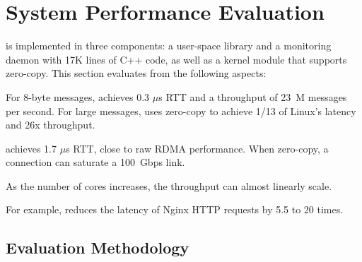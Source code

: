 \section{System Performance Evaluation}
\label{socksdirect:sec:evaluation}


\sys{} is implemented in three components: a user-space library \libipc{} and a monitoring daemon with 17K lines of C++ code, as well as a kernel module that supports zero-copy.
This section evaluates \sys{} from the following aspects:

For 8-byte messages, \sys achieves 0.3 $\mu$s RTT and a throughput of 23~M messages per second. For large messages, \sys uses zero-copy to achieve 1/13 of Linux's latency and 26x throughput.

\sys achieves 1.7 $\mu$s RTT, close to raw RDMA performance.
When zero-copy, a connection can saturate a 100~Gbps link.



As the number of cores increases, the throughput can almost linearly scale.

For example, \sys {} reduces the latency of Nginx HTTP requests by 5.5 to 20 times.

\subsection{Evaluation Methodology}
\label{socksdirect:subsec:methodology}

